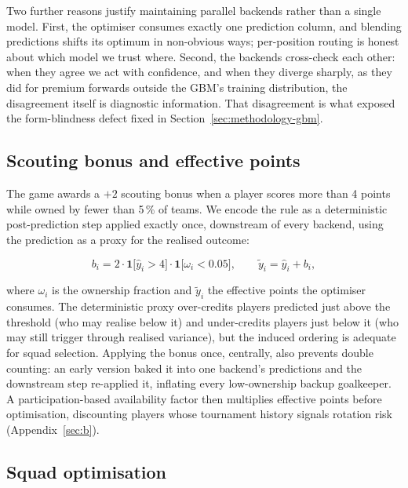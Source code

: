 Two further reasons justify maintaining parallel backends rather than
a single model. First, the optimiser consumes exactly one prediction
column, and blending predictions shifts its optimum in non-obvious
ways; per-position routing is honest about which model we trust
where. Second, the backends cross-check each other: when they agree
we act with confidence, and when they diverge sharply, as they did
for premium forwards outside the GBM's training distribution, the
disagreement itself is diagnostic information. That disagreement is
what exposed the form-blindness defect fixed in
Section~\ref{sec:methodology-gbm}.

\subsection{Scouting bonus and effective points}
\label{sec:methodology-scouting}

The game awards a $+2$ scouting bonus when a player scores more than
4 points while owned by fewer than 5\,\% of teams. We encode the rule
as a deterministic post-prediction step applied exactly once,
downstream of every backend, using the prediction as a proxy for the
realised outcome:

\begin{equation}
b_i = 2 \cdot \mathbf{1}\bigl[\hat{y}_i > 4\bigr]
        \cdot \mathbf{1}\bigl[\omega_i < 0.05\bigr],
\qquad
\tilde{y}_i = \hat{y}_i + b_i,
\label{eq:scouting}
\end{equation}

where $\omega_i$ is the ownership fraction and $\tilde{y}_i$ the
effective points the optimiser consumes. The deterministic proxy
over-credits players predicted just above the threshold (who may
realise below it) and under-credits players just below it (who may
still trigger through realised variance), but the induced ordering
is adequate for squad selection. Applying the bonus once, centrally,
also prevents double counting: an early version baked it into one
backend's predictions and the downstream step re-applied it,
inflating every low-ownership backup goalkeeper. A
participation-based availability factor then multiplies effective
points before optimisation, discounting players whose tournament
history signals rotation risk (Appendix~\ref{sec:b}).

\subsection{Squad optimisation}
\label{sec:methodology-milp}

